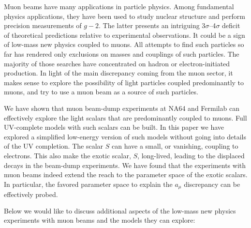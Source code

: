 \documentclass[prd,onecolumn,notitlepage,
nofootinbib,aps,tightenlines,
preprintnumbers,amsmath,amssymb,amsfonts,showpacs,superscriptaddress]{revtex4-1}
\begin{document}
Muon beams have many applications in particle physics. Among fundamental physics applications, 
they have been used to study nuclear structure and perform precision measurements of $g-2$. 
The latter presents an intriguing 3$\sigma$--4$\sigma$ deficit of theoretical predictions relative to 
experimental observations. It could be a sign of low-mass new physics coupled to muons. All attempts to find such particles 
so far has rendered only exclusions on masses and couplings of such particles.  The majority of those searches have concentrated on hadron or electron-initiated production. In light of the main discrepancy coming from the muon sector, it makes 
sense to explore the possibility of light particles coupled predominantly to muons, and try to use a muon beam as 
a source of such particles. 

We have shown that muon beam-dump experiments at NA64 and Fermilab can effectively explore the light scalars that are predominantly coupled to muons.  Full UV-complete models with such scalars can be built. In this paper we have explored a simplified low-energy version of such models without going into details of the UV completion. The scalar $S$ can have a small, or vanishing, coupling to electrons. This also make the exotic scalar, $S$, long-lived, leading to the displaced decays in the beam-dump experiments. 
We have found that the experiments with muon beams indeed 
extend the reach to the parameter space of the exotic scalars. In particular, the favored parameter space to explain the $a_\mu$ discrepancy can be effectively probed.

Below we would like to discuss additional aspects of the low-mass new physics experiments with muon beams and the models they can explore:
\end{document}
